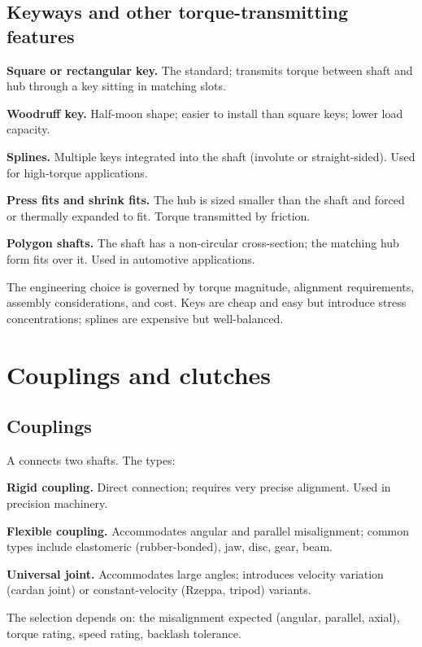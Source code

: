 \subsection{Keyways and other torque-transmitting features}

\textbf{Square or rectangular key.} The standard; transmits torque between shaft and hub through a key sitting in matching slots.

\textbf{Woodruff key.} Half-moon shape; easier to install than square keys; lower load capacity.

\textbf{Splines.} Multiple keys integrated into the shaft (involute or straight-sided). Used for high-torque applications.

\textbf{Press fits and shrink fits.} The hub is sized smaller than the shaft and forced or thermally expanded to fit. Torque transmitted by friction.

\textbf{Polygon shafts.} The shaft has a non-circular cross-section; the matching hub form fits over it. Used in automotive applications.

The engineering choice is governed by torque magnitude, alignment requirements, assembly considerations, and cost. Keys are cheap and easy but introduce stress concentrations; splines are expensive but well-balanced.

\section{Couplings and clutches}

\subsection{Couplings}

A  connects two shafts. The types:

\textbf{Rigid coupling.} Direct connection; requires very precise alignment. Used in precision machinery.

\textbf{Flexible coupling.} Accommodates angular and parallel misalignment; common types include elastomeric (rubber-bonded), jaw, disc, gear, beam.

\textbf{Universal joint.} Accommodates large angles; introduces velocity variation (cardan joint) or constant-velocity (Rzeppa, tripod) variants.

The selection depends on: the misalignment expected (angular, parallel, axial), torque rating, speed rating, backlash tolerance.

